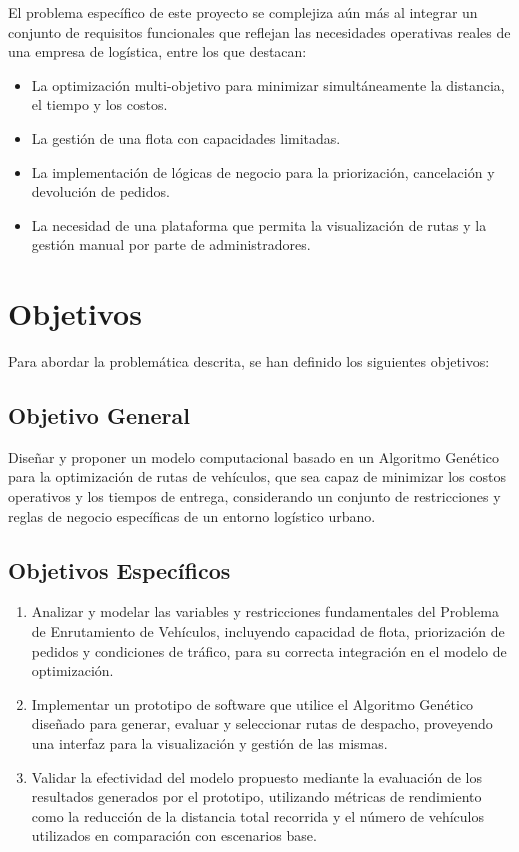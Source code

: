 El problema específico de este proyecto se complejiza aún más al integrar un conjunto de requisitos funcionales que reflejan las necesidades operativas reales de una empresa de logística, entre los que destacan:
\begin{itemize}
    \item La optimización multi-objetivo para minimizar simultáneamente la distancia, el tiempo y los costos.
    \item La gestión de una flota con capacidades limitadas.
    \item La implementación de lógicas de negocio para la priorización, cancelación y devolución de pedidos.
    \item La necesidad de una plataforma que permita la visualización de rutas y la gestión manual por parte de administradores.
\end{itemize}

\section{Objetivos}
Para abordar la problemática descrita, se han definido los siguientes objetivos:

\subsection{Objetivo General}
Diseñar y proponer un modelo computacional basado en un Algoritmo Genético para la optimización de rutas de vehículos, que sea capaz de minimizar los costos operativos y los tiempos de entrega, considerando un conjunto de restricciones y reglas de negocio específicas de un entorno logístico urbano.

\subsection{Objetivos Específicos}
\begin{enumerate}
    \item Analizar y modelar las variables y restricciones fundamentales del Problema de Enrutamiento de Vehículos, incluyendo capacidad de flota, priorización de pedidos y condiciones de tráfico, para su correcta integración en el modelo de optimización.
    \item Implementar un prototipo de software que utilice el Algoritmo Genético diseñado para generar, evaluar y seleccionar rutas de despacho, proveyendo una interfaz para la visualización y gestión de las mismas.
    \item Validar la efectividad del modelo propuesto mediante la evaluación de los resultados generados por el prototipo, utilizando métricas de rendimiento como la reducción de la distancia total recorrida y el número de vehículos utilizados en comparación con escenarios base.
\end{enumerate}

